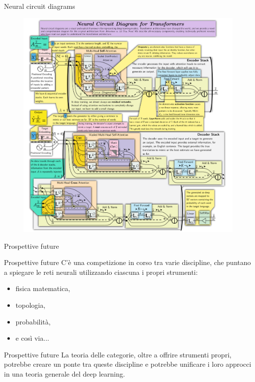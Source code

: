 \documentclass{beamer}
\begin{document}
\begin{frame}{Neural circuit diagrams}
    \begin{figure}
        \begin{center}
            \includegraphics[width=\textwidth]{figures/transformer_ncd.png}
            \caption*{}
        \end{center}
    \end{figure}
\end{frame}

\begin{frame}[standout]
    \huge Prospettive future
\end{frame}

\begin{frame}{Prospettive future}
    C'è una competizione in corso tra varie discipline, che puntano a spiegare le reti neurali utilizzando ciascuna i propri strumenti:
    \begin{itemize}
        \item<1-> fisica matematica,
        \item<2-> topologia,
        \item<3-> probabilità,
        \item<4-> e così via...
    \end{itemize}
    
\end{frame}

\begin{frame}{Prospettive future}
    La teoria delle categorie, oltre a offrire strumenti propri, potrebbe creare un ponte tra queste discipline e potrebbe unificare i loro approcci in una teoria generale del deep learning.
\end{frame}
\end{document}
